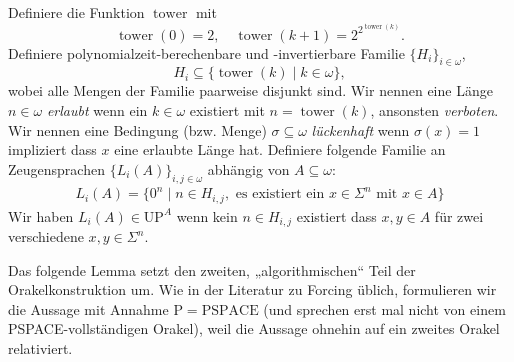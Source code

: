 \documentclass[nofonts]{uebung}
\theoremstyle{definition}
\def\P{\ensuremath{\mathrm{P}}}
\def\UP{\ensuremath{\mathrm{UP}}}
\def\PSPACE{\ensuremath{\mathrm{PSPACE}}}
\DeclareMathOperator{\tower}{tower}
\begin{document}
Definiere die Funktion $\tower$ mit \[ \tower(0)=2, \quad \tower(k+1)=2^{2^{\tower(k)}}. \]
Definiere polynomialzeit-berechenbare und -invertierbare Familie $\{H_{i}\}_{i\in\omega}$, \[ H_i\subseteq\{ \tower(k) \mid k\in\omega \}, \]wobei
alle Mengen der Familie paarweise disjunkt sind.
Wir nennen eine Länge $n\in\omega$ \emph{erlaubt} wenn ein $k\in\omega$ existiert mit $n=\tower(k)$, ansonsten \emph{verboten}.
Wir nennen eine Bedingung (bzw. Menge) $\sigma\subseteq \omega$ \emph{lückenhaft} wenn $\sigma(x)=1$ impliziert dass $x$ eine erlaubte Länge hat.
Definiere folgende Familie an Zeugensprachen $\{L_{i}(A) \}_{i,j\in\omega}$ abhängig von $A\subseteq\omega$:
\begin{gather*}
    L_{i}(A) = \{ 0^n \mid n\in H_{i,j}, \text{ es existiert ein $x\in\Sigma^n$ mit $x\in A$} \}
\end{gather*}
Wir haben $L_{i}(A)\in\UP^A$ wenn kein $n\in H_{i,j}$ existiert dass $x, y\in A$ für zwei verschiedene $x,y\in\Sigma^n$.

Das folgende Lemma setzt den zweiten, „algorithmischen“ Teil der Orakelkonstruktion um. Wie in der Literatur zu Forcing üblich, formulieren wir die Aussage mit Annahme $\P=\PSPACE$ (und sprechen erst mal nicht von einem PSPACE-vollständigen Orakel), weil die Aussage ohnehin auf ein zweites Orakel relativiert.
\end{document}
